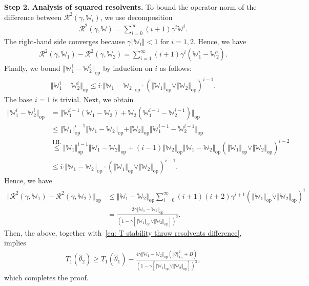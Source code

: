 \documentclass[11pt]{article}
\newcommand{\op}{\mathrm{op}}
\newcommand{\bbW}{\mathbb{W}}
\newcommand{\cR}{\mathcal{R}}
\newcommand{\<}{\langle}
\renewcommand{\>}{\rangle}
\theoremstyle{plain}
\theoremstyle{definition}
\theoremstyle{remark}
\begin{document}
\noindent \textbf{Step 2. Analysis of squared resolvents.} To bound the operator norm of the difference between $\cR^2(\gamma, \bbW_i)$, we use decomposition
\begin{align*}
	\cR^2(\gamma, \bbW) = \sum_{i = 0}^\infty (i + 1) \gamma^i \bbW^i.
\end{align*}
The right-hand side converges because $\gamma \Vert \bbW_i \Vert <1$ for $i = 1, 2$.
Hence, we have
\begin{align*}
	\cR^2(\gamma, \bbW_1) - \cR^2(\gamma, \bbW_2) = \sum_{i = 1}^\infty (i + 1) \gamma^i (\bbW_1^i - \bbW_2^i).
\end{align*}
Finally, we bound $\Vert \bbW_1^i - \bbW_2^i \Vert_{\op}$ by induction on $i$ as follows:
\begin{align*}
	\Vert \bbW_1^i - \bbW_2^i \Vert_{\op} \le i \cdot \Vert \bbW_1 - \bbW_2 \Vert_{\op} \cdot (\Vert \bbW_1 \Vert_{\op} \vee \Vert \bbW_2 \Vert_{\op})^{i - 1}.
\end{align*}
The base $i = 1$ is trivial. Next, we obtain 
\begin{align*}
	{\Vert \bbW_1^i - \bbW_2^i \Vert}_{\op} & = \Vert \bbW^{i - 1}_1 (\bbW_1 - \bbW_2) + \bbW_2 (\bbW^{i - 1}_1 - \bbW_2^{i - 1}) \Vert_{\op} \\
	& \le \Vert \bbW_1 \Vert_{\op}^{i - 1}  \Vert \bbW_1 - \bbW_2 \Vert_{\op} + \Vert \bbW_2 \Vert_{\op} \Vert \bbW^{i - 1}_1 - \bbW_2^{i - 1} \Vert_{\op} \\
	& \overset{\text{I.H.}}{\le} \Vert \bbW_1 \Vert_{\op}^{i - 1} \Vert \bbW_1 - \bbW_2 \Vert_{\op} + (i - 1) \Vert \bbW_2 \Vert_{\op} \Vert \bbW_1 - \bbW_2 \Vert_{\op} (\Vert \bbW_1 \Vert_{\op} \vee \Vert \bbW_2 \Vert_{\op})^{i - 2} \\
	& \le i \cdot \Vert \bbW_1 - \bbW_2 \Vert_{\op} \cdot (\Vert \bbW_1 \Vert_{\op} \vee \Vert \bbW_2 \Vert_{\op})^{i - 1}.
\end{align*}
Hence, we have
\begin{align}
	\Vert \cR^2(\gamma, \bbW_1) - \cR^2(\gamma, \bbW_2) \Vert_{\op} & \le \Vert \bbW_1 - \bbW_2 \Vert_{\op} \sum_{i = 0}^{\infty} (i + 1)(i + 2) \gamma^{i + 1} (\Vert \bbW_1 \Vert_{\op} \vee \Vert \bbW_2 \Vert_{\op})^{i} \nonumber \\
	& = \frac{2 \gamma \Vert \bbW_1 - \bbW_2 \Vert_{\op}}{(1 - \gamma [\Vert \bbW_1 \Vert_{\op} \vee \Vert \bbW_2 \Vert_{\op}])^3}. \label{eq: resolvent different upper bound}
\end{align}
Then, the above, together with~\eqref{eq: T stability throw resolvents difference}, implies
\begin{align*}
    T_1(\hat{\theta}_2) \ge T_1(\hat{\theta}_1) - \frac{4 \gamma \Vert \bbW_1 - \bbW_2 \Vert_{\op} (\Vert \theta \Vert_{L_2}^2 + B)}{(1 - \gamma [\Vert \bbW_1 \Vert_{\op} \vee \Vert \bbW_2 \Vert_{\op}])^3},
\end{align*}
which completes the proof.
\end{document}
